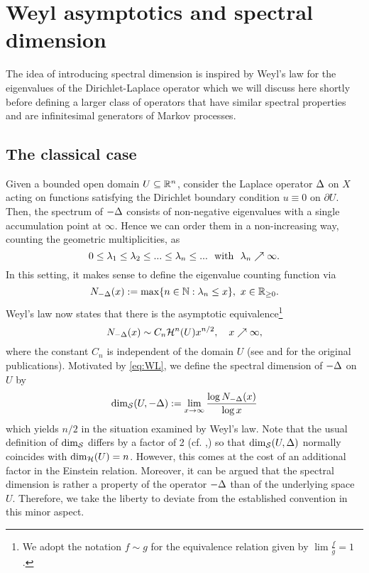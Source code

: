 \section{Weyl asymptotics and spectral dimension}

The idea of introducing spectral dimension is inspired by Weyl's law for the eigenvalues of the Dirichlet-Laplace operator which we will discuss here shortly before defining a larger class of operators that have similar spectral properties and are infinitesimal generators of Markov processes.

\subsection{The classical case}

Given a bounded open domain $U\subseteq\mathbb{R}^n$, consider the Laplace operator $\Delta$ on $X$ acting on functions satisfying the Dirichlet boundary condition $u\equiv0$ on $\partial U$. Then, the spectrum of $-\Delta$ consists of non-negative eigenvalues with a single accumulation point at $\infty$. Hence we can order them in a non-increasing way, counting the geometric multiplicities, as
\begin{equation}\label{eq:EVs}
  0\leq\gl_1\leq\gl_2\leq...\leq\gl_n\leq...\ \text{ with }\ \gl_n\nearrow\infty. 
\end{equation}
In this setting, it makes sense to define the eigenvalue counting function via 
\begin{equation}\label{eq:DECF}
  N_{-\Delta}(x):=\max\{n\in\mathbb{N}:\lambda_n\leq x\},\ x\in\mathbb{R}_{\geq0}.
\end{equation}
Weyl's law now states that there is the asymptotic equivalence\footnote{We adopt the notation $f\sim g$ for the equivalence relation given by $\lim\frac{f}{g}=1$.}
\begin{equation}\label{eq:WL}
  N_{-\Delta}(x)\sim C_n\mathcal{H}^n(U)x^{n/2},\quad x\nearrow\infty,
\end{equation}
where the constant $C_n$ is independent of the domain $U$ (see \cite{Weyl1911} and \cite{Weyl1912} for the original publications). Motivated by \eqref{eq:WL}, we define the spectral dimension of $-\Delta$ on $U$ by
\begin{equation}\label{eq:dims}
  \dim_{\mathcal{S}}(U,-\Delta):=\lim_{x\to\infty}\frac{\log N_{-\Delta}(x)}{\log x}
\end{equation}
which yields $n/2$ in the situation examined by Weyl's law. Note that the usual definition of $\dim_{\mathcal{S}}$ differs by a factor of 2 (cf. \cite{kigami1993weyl},\cite{hambly_kigami_kumagai_2002}) so that $\dim_{\mathcal{S}}(U,\Delta)$ normally coincides with $\dim_{\mathcal{H}}(U)=n$. However, this comes at the cost of an additional factor in the Einstein relation. Moreover, it can be argued that the spectral dimension is rather a property of the operator $-\Delta$ than of the underlying space $U$. Therefore, we take the liberty to deviate from the established convention in this minor aspect.

